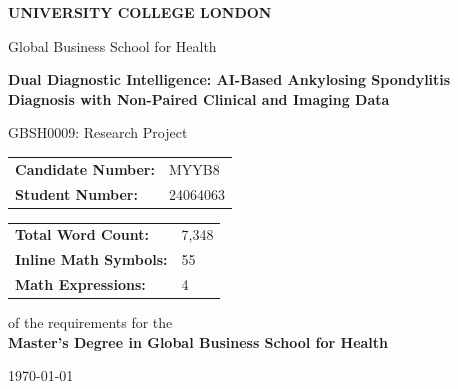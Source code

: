 \documentclass[12pt, a4paper]{article}
\begin{document}
\newpage

\begin{titlepage}
\begin{center}


\vspace{1cm}

{\Large \textbf{UNIVERSITY COLLEGE LONDON}}

\vspace{0.5cm}

{\large Global Business School for Health}

\vspace{1.5cm}

{\LARGE \textbf{Dual Diagnostic Intelligence: AI-Based Ankylosing Spondylitis Diagnosis with Non-Paired Clinical and Imaging Data}}

\vspace{2cm}

{\large GBSH0009: Research Project}

\vspace{1.5cm}

\begin{tabular}{ll}
\textbf{Candidate Number:} & MYYB8 \\
\textbf{Student Number:} & 24064063 \\
\end{tabular}

\vspace{1.5cm}

\begin{tabular}{ll}
\textbf{Total Word Count:} & 7,348 \\
\textbf{Inline Math Symbols:} & 55 \\
\textbf{Math Expressions:} & 4 \\
\end{tabular}

\vspace{1.5cm}


\vspace{0.5cm}
{\large of the requirements for the}\\
\vspace{0.5cm}
{\Large \textbf{Master's Degree in Global Business School for Health}}

\vspace{1cm}

{\large \today}

\end{center}
\end{titlepage}
\end{document}
